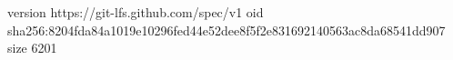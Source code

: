 version https://git-lfs.github.com/spec/v1
oid sha256:8204fda84a1019e10296fed44e52dee8f5f2e831692140563ac8da68541dd907
size 6201
